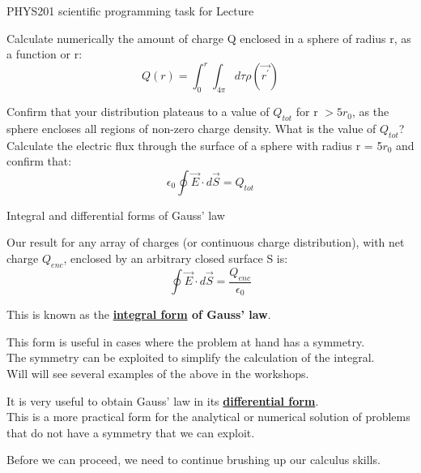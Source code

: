 {\begin{frame}{PHYS201 scientific programming task for Lecture \thislecture}
{\vspace{0.2cm}
Calculate numerically the amount of charge Q enclosed in a sphere of radius r, as a function or r:\\
\begin{equation*}
  Q(r) = \int_{0}^{r} \int_{4\pi} d\tau \rho(\vec{r^\prime})
\end{equation*}

\vspace{0.2cm}
Confirm that your distribution plateaus to a value of $Q_{tot}$ for
r $>5r_0$, as the sphere encloses all regions of non-zero charge density.
What is the value of $Q_{tot}$?\\

\vspace{0.2cm}
Calculate the electric flux through the surface of a sphere with radius r = 5$r_0$
and confirm that:
\begin{equation*}
  \epsilon_0 \oint \vec{E} \cdot d\vec{S} = Q_{tot}
\end{equation*}
}

\end{frame}

} %






%
%
%

\begin{frame}{Integral and differential forms of Gauss' law}

Our result for any array of charges (or continuous charge distribution), with net charge $Q_{enc}$,
enclosed by an arbitrary closed surface S is:
\begin{equation*}
  \oint \vec{E} \cdot d\vec{S} = \frac{Q_{enc}}{\epsilon_0}
\end{equation*}

This is known as the {\bf \underline{integral form} of Gauss' law}.\\
\vspace{0.2cm}

This form is useful in cases where the problem at hand has a symmetry.\\
The symmetry can be exploited to simplify the calculation of the integral.\\
Will will see several examples of the above in the workshops.\\
\vspace{0.2cm}

It is very useful to obtain Gauss' law in its {\bf \underline{differential form}}.\\
This is a more practical form for the analytical or numerical solution of problems
that do not have a symmetry that we can exploit.\\
\vspace{0.2cm}

Before we can proceed, we need to continue brushing up our calculus skills.

\end{frame}



